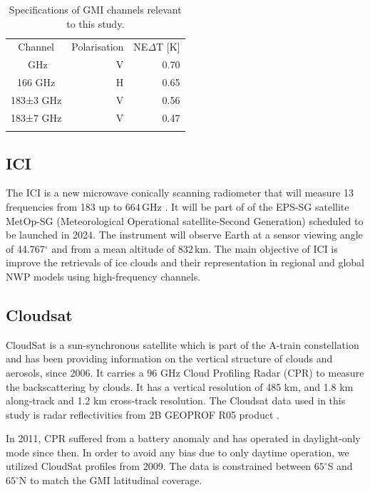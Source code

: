 \documentclass[amt, manuscript]{copernicus}
\begin{document}
\begin{table}[t]
	\caption{Specifications of GMI channels relevant to this study.}
	\label{tab:gmi_channels}	
	\begin{tabular}{crr}
		\tophline
		Channel  & Polarisation 	& NE$\Delta$T  [K]\\
		\middlehline
			166\,\,GHz  		  & V		& 0.70	\\
			166\,\,GHz   		  & H 		& 0.65 \\
			183±3\,\,GHz         & V 	    & 0.56 \\
		    183±7\,\,GHz         & V 		& 0.47 \\
		\bottomhline
	\end{tabular}
\end{table}

\subsection{ICI}
%
\label{sec:ici}

The ICI is a new microwave conically scanning radiometer that will measure 13 frequencies from 183 up to 664\,GHz \citep{eriksson:towar:20}. It will be part of of the EPS-SG satellite MetOp-SG (Meteorological Operational satellite-Second Generation) scheduled to be launched in 2024. The instrument will
observe Earth at a sensor viewing angle of 44.767$^{\circ}$ and from a mean altitude of 832\,km. The main objective of ICI is improve the retrievals of ice clouds and their representation in regional and global NWP models using high-frequency channels. 

\subsection{Cloudsat}
%
\label{sec:cloudsat}
CloudSat is a sun-synchronous satellite which is part of the A-train constellation and has been providing information on the vertical structure of clouds and aerosols, since 2006. It carries a 96\,\,GHz Cloud Profiling Radar (CPR) to measure the backscattering by clouds. It has a vertical resolution of 485\,\,km, and 1.8\,\,km along-track and 1.2\,\,km cross-track resolution. The Cloudsat data used in this study is  radar reflectivities from 2B GEOPROF R05 product \citep{marchand:hydro:08}.

In 2011, CPR suffered from a battery anomaly and has operated in daylight-only mode since then. In order to avoid any bias due to only daytime operation, we utilized CloudSat profiles from 2009. The data is constrained between $65^{\circ}$S and $65^{\circ}$N to match the GMI latitudinal coverage.  
\end{document}
